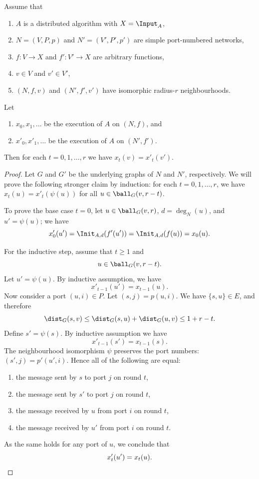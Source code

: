 \begin{theorem}\label{thm:local-neighbourhood}
    Assume that
    \begin{enumerate}[itemsep=0ex]\raggedright
        \item $A$ is a distributed algorithm with $X = \Input_A$,
        \item $N = (V,P,p)$ and $N' = (V'\!,P'\!,p')$ are simple port-numbered networks,
        \item $f\colon V \to X$ and $f'\colon V' \to X$ are arbitrary functions,
        \item $v \in V$ and $v' \in V'$,
        \item $(N,f,v)$ and $(N'\!,f'\!,v')$ have isomorphic radius-$r$ neighbourhoods.
    \end{enumerate}
    Let
    \begin{enumerate}[resume*]
        \item $x_0, x_1, \dotsc$ be the execution of $A$ on $(N,f)$, and
        \item $x'_0, x'_1, \dotsc$ be the execution of $A$ on $(N'\!,f')$.
    \end{enumerate}
    Then for each $t = 0, 1, \dotsc, r$ we have $x_t(v) = x'_t(v')$.
\end{theorem}

\begin{proof}
    Let $G$ and $G'$ be the underlying graphs of $N$ and $N'$, respectively. We will prove the following stronger claim by induction: for each $t = 0, 1, \dotsc, r$, we have $x_t(u) = x'_t(\psi(u))$ for all $u \in \ball_G(v,r-t)$.
    
    To prove the base case $t = 0$, let $u \in \ball_G(v,r)$, $d = \deg_N(u)$, and $u' = \psi(u)$; we have
    \[
        x'_0(u') = \Init_{A,d}(f'(u')) = \Init_{A,d}(f(u)) = x_0(u).
    \]
    
    For the inductive step, assume that $t \ge 1$ and \[u \in \ball_G(v,r-t).\] Let $u' = \psi(u)$. By inductive assumption, we have
    \[
        x'_{t-1}(u') = x_{t-1}(u).
    \]
    Now consider a port $(u,i) \in P$. Let $(s,j) = p(u,i)$. We have $\{s,u\} \in E$, and therefore
    \[
        \dist_G(s,v) \le \dist_G(s,u) + \dist_G(u,v) \le 1 + r-t.
    \]
    Define $s' = \psi(s)$. By inductive assumption we have
    \[
        x'_{t-1}(s') = x_{t-1}(s).
    \]
    The neighbourhood isomorphism $\psi$ preserves the port numbers: $(s',j) = p'(u',i)$. Hence all of the following are equal:
    \begin{enumerate}[noitemsep]
        \item the message sent by $s$ to port $j$ on round $t$,
        \item the message sent by $s'$ to port $j$ on round $t$,
        \item the message received by $u$ from port $i$ on round $t$,
        \item the message received by $u'$ from port $i$ on round $t$.
    \end{enumerate}
    As the same holds for any port of $u$, we conclude that
    \[
        x'_t(u') = x_t(u). \qedhere
    \]
\end{proof}


